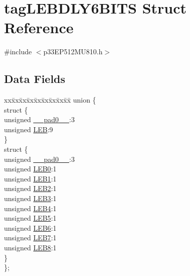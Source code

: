 \hypertarget{structtag_l_e_b_d_l_y6_b_i_t_s}{}\section{tag\+L\+E\+B\+D\+L\+Y6\+B\+I\+TS Struct Reference}
\label{structtag_l_e_b_d_l_y6_b_i_t_s}


{\ttfamily \#include $<$p33\+E\+P512\+M\+U810.\+h$>$}

\subsection*{Data Fields}
\begin{DoxyCompactItemize}
\item 
\begin{tabbing}
xx\=xx\=xx\=xx\=xx\=xx\=xx\=xx\=xx\=\kill
union \{\\
\>struct \{\\
\>\>unsigned \hyperlink{structtag_l_e_b_d_l_y6_b_i_t_s_adf71f3d8410c1f1dbbc96680a92c49af}{\_\_pad0\_\_}:3\\
\>\>unsigned \hyperlink{structtag_l_e_b_d_l_y6_b_i_t_s_a850b96052b17c96a4012653317c39bdf}{LEB}:9\\
\>\} \\
\>struct \{\\
\>\>unsigned \hyperlink{structtag_l_e_b_d_l_y6_b_i_t_s_adf71f3d8410c1f1dbbc96680a92c49af}{\_\_pad0\_\_}:3\\
\>\>unsigned \hyperlink{structtag_l_e_b_d_l_y6_b_i_t_s_a1710dcadd784ef12033a5cf8121accb3}{LEB0}:1\\
\>\>unsigned \hyperlink{structtag_l_e_b_d_l_y6_b_i_t_s_ab0505c0f812822c77a65e8bfe2db4f40}{LEB1}:1\\
\>\>unsigned \hyperlink{structtag_l_e_b_d_l_y6_b_i_t_s_a120826056ccccfac30aa9e8a0569ae88}{LEB2}:1\\
\>\>unsigned \hyperlink{structtag_l_e_b_d_l_y6_b_i_t_s_a7b918c1b7306fd3ff86ab19bcb5365a4}{LEB3}:1\\
\>\>unsigned \hyperlink{structtag_l_e_b_d_l_y6_b_i_t_s_a5fbd877152dfc4182c4456b4224ec747}{LEB4}:1\\
\>\>unsigned \hyperlink{structtag_l_e_b_d_l_y6_b_i_t_s_a4371c46a68a319773f493c25667df943}{LEB5}:1\\
\>\>unsigned \hyperlink{structtag_l_e_b_d_l_y6_b_i_t_s_a2b8fccc4fb31a13c611cfb0d1c53aff0}{LEB6}:1\\
\>\>unsigned \hyperlink{structtag_l_e_b_d_l_y6_b_i_t_s_aa76d586b04119d8459718019ddd964ef}{LEB7}:1\\
\>\>unsigned \hyperlink{structtag_l_e_b_d_l_y6_b_i_t_s_a9b22b47001301c6ae00c3eea0f385091}{LEB8}:1\\
\>\} \\
\}; \\

\end{tabbing}\end{DoxyCompactItemize}


